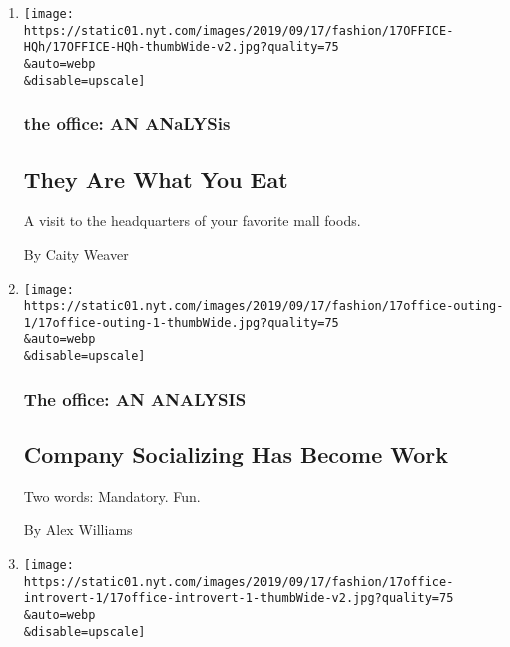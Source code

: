 \begin{enumerate}
\def\labelenumi{\arabic{enumi}.}
\item
  \href{/2019/09/17/style/moes-cinnabon-focus-brands.html}{}

  \texttt{[image: https://static01.nyt.com/images/2019/09/17/fashion/17OFFICE-HQh/17OFFICE-HQh-thumbWide-v2.jpg?quality=75\\\&auto=webp\\\&disable=upscale]}

  \hypertarget{the-office-an-analysis-4}{%
  \subsubsection{the office: AN
  ANaLYSis}\label{the-office-an-analysis-4}}

  \hypertarget{they-are-what-you-eat}{%
  \subsection{They Are What You Eat}\label{they-are-what-you-eat}}

  A visit to the headquarters of your favorite mall foods.

  By Caity Weaver
\item
  \href{/2019/09/17/style/company-socializing-is-work.html}{}

  \texttt{[image: https://static01.nyt.com/images/2019/09/17/fashion/17office-outing-1/17office-outing-1-thumbWide.jpg?quality=75\\\&auto=webp\\\&disable=upscale]}

  \hypertarget{the-office-an-analysis-5}{%
  \subsubsection{The office: AN
  ANALYSIS}\label{the-office-an-analysis-5}}

  \hypertarget{company-socializing-has-become-work}{%
  \subsection{Company Socializing Has Become
  Work}\label{company-socializing-has-become-work}}

  Two words: Mandatory. Fun.

  By Alex Williams
\item
  \href{/2019/09/17/style/the-plight-of-the-office-introvert.html}{}

  \texttt{[image: https://static01.nyt.com/images/2019/09/17/fashion/17office-introvert-1/17office-introvert-1-thumbWide-v2.jpg?quality=75\\\&auto=webp\\\&disable=upscale]}


\end{enumerate}
